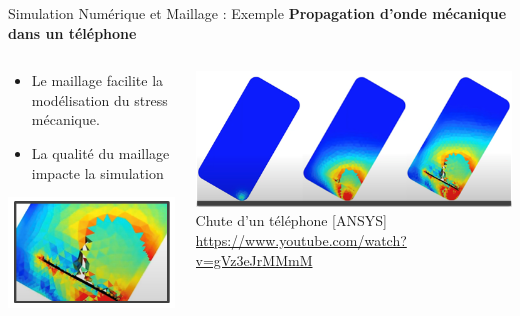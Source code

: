 \begin{frame}{Simulation Numérique et Maillage : Exemple}
    \textbf{Propagation d'onde mécanique dans un téléphone}
    
    \begin{columns}
        \begin{column}{0.4\textwidth}
            \begin{itemize}
                \item Le maillage facilite la modélisation du stress mécanique.
                \item La qualité du maillage impacte la simulation 
            \end{itemize}
            \begin{center}
                \includegraphics[width=.9\linewidth]{img/new_images/convergence_depend_simu.PNG}
            \end{center}
        \end{column}
        \begin{column}{0.6\textwidth}
            \includegraphics[width=\linewidth]{img/new_images/phone_drop.png}
            Chute d'un téléphone [ANSYS]\\
            \scriptsize{\url{https://www.youtube.com/watch?v=gVz3eJrMMmM}}
        \end{column}
    \end{columns}
\end{frame}

